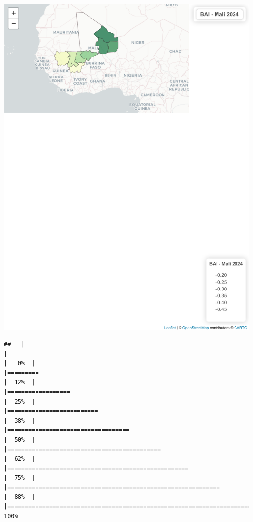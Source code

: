\documentclass[
]{book}
\begin{document}
\includegraphics{Atlas-Spectral-Sahel_files/figure-latex/bai-cartes-3.pdf}

\begin{verbatim}
##   |                                                                              |                                                                      |   0%  |                                                                              |=========                                                             |  12%  |                                                                              |==================                                                    |  25%  |                                                                              |==========================                                            |  38%  |                                                                              |===================================                                   |  50%  |                                                                              |============================================                          |  62%  |                                                                              |====================================================                  |  75%  |                                                                              |=============================================================         |  88%  |                                                                              |======================================================================| 100%
\end{verbatim}
\end{document}
